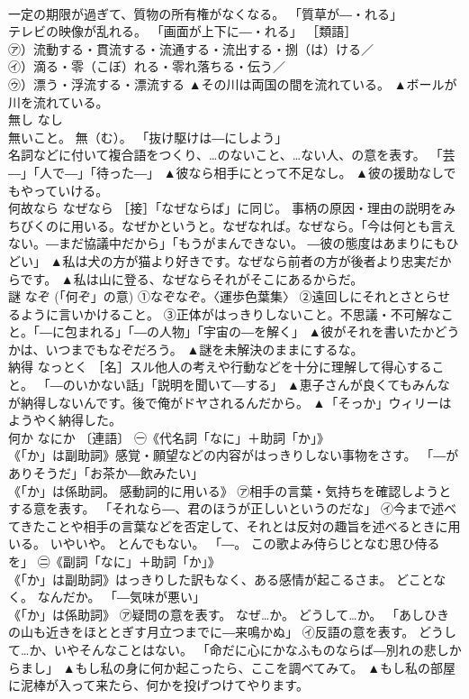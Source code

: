 \documentclass[8pt]{extreport}
\begin{document}
\begin{CJK}{UTF8}{min}
\\	一定の期限が過ぎて、質物の所有権がなくなる。 「質草が―・れる」 
\\	テレビの映像が乱れる。 「画面が上下に―・れる」 ［類語］
\\	㋐）流動する・貫流する・流通する・流出する・捌（は）ける／
\\	㋑）滴る・零（こぼ）れる・零れ落ちる・伝う／
\\	㋒）漂う・浮流する・漂流する	▲その川は両国の間を流れている。 ▲ボールが川を流れている。
\\	無し	なし	
\\	無いこと。 無（む）。 「抜け駆けは―にしよう」 
\\	名詞などに付いて複合語をつくり、…のないこと、…ない人、の意を表す。 「芸―」「人で―」「待った―」	▲彼なら相手にとって不足なし。 ▲彼の援助なしでもやっていける。
\\	何故なら	なぜなら	［接］「なぜならば」に同じ。 事柄の原因・理由の説明をみちびくのに用いる。なぜかというと。なぜなれば。なぜなら。「今は何とも言えない。―まだ協議中だから」「もうがまんできない。 ―彼の態度はあまりにもひどい」	▲私は犬の方が猫より好きです。なぜなら前者の方が後者より忠実だからです。 ▲私は山に登る、なぜならそれがそこにあるからだ。
\\	謎	なぞ	(「何ぞ」の意) ①なぞなぞ。〈運歩色葉集〉 ②遠回しにそれとさとらせるように言いかけること。 ③正体がはっきりしないこと。不思議・不可解なこと。「―に包まれる」「―の人物」「宇宙の―を解く」	▲彼がそれを書いたかどうかは、いつまでもなぞだろう。 ▲謎を未解決のままにするな。
\\	納得	なっとく	［名］スル他人の考えや行動などを十分に理解して得心すること。 「―のいかない話」「説明を聞いて―する」	▲恵子さんが良くてもみんなが納得しないんです。後で俺がドヤされるんだから。 ▲「そっか」ウィリーはようやく納得した。
\\	何か	なにか	〔連語〕 ㊀《代名詞「なに」＋助詞「か」》 
\\	《「か」は副助詞》感覚・願望などの内容がはっきりしない事物をさす。 「―がありそうだ」「お茶か―飲みたい」 
\\	《「か」は係助詞。 感動詞的に用いる》 ㋐相手の言葉・気持ちを確認しようとする意を表す。 「それなら―、君のほうが正しいというのだな」 ㋑今まで述べてきたことや相手の言葉などを否定して、それとは反対の趣旨を述べるときに用いる。 いやいや。 とんでもない。 「―。 この歌よみ侍らじとなむ思ひ侍るを」 ㊁《副詞「なに」＋助詞「か」》 
\\	《「か」は副助詞》はっきりした訳もなく、ある感情が起こるさま。 どことなく。 なんだか。 「―気味が悪い」 
\\	《「か」は係助詞》 ㋐疑問の意を表す。 なぜ…か。 どうして…か。 「あしひきの山も近きをほととぎす月立つまでに―来鳴かぬ」 ㋑反語の意を表す。 どうして…か、いやそんなことはない。 「命だに心にかなふものならば―別れの悲しからまし」	▲もし私の身に何か起こったら、ここを調べてみて。 ▲もし私の部屋に泥棒が入って来たら、何かを投げつけてやります。

\end{CJK}
\end{document}
